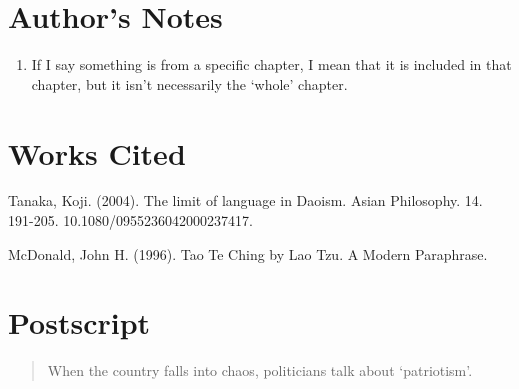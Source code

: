 \section*{\centering Author's Notes}

\begin{enumerate}
    \item If I say something is from a specific chapter, I mean that it is included in that chapter, but it isn’t necessarily the ‘whole’ chapter.
\end{enumerate}


\section*{\centering Works Cited}

Tanaka, Koji. (2004). The limit of language in Daoism. Asian Philosophy. 14. 191-205. 10.1080/0955236042000237417.

McDonald, John H. (1996). Tao Te Ching by Lao Tzu. A Modern Paraphrase.

\section*{\centering Postscript}

\begin{verse}
When the country falls into chaos, politicians talk about `patriotism'.\\
\end{verse}
    
